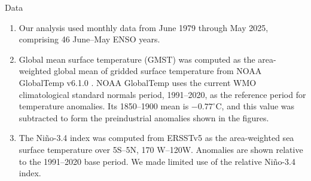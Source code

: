 \documentclass[aspectratio=169,xcolor=dvipsnames]{beamer}
\begin{document}
\begin{frame}{Data}
  \begin{enumerate}
  \item Our analysis used monthly data from June 1979 through May
    2025, comprising 46 June--May ENSO years.

  \item Global mean surface temperature (GMST) was computed as the
    area-weighted global mean of gridded surface temperature from NOAA
    GlobalTemp v6.1.0 \citep{Huang2022improvements}. NOAA GlobalTemp
    uses the current WMO climatological standard normals period,
    1991--2020, as the reference period for temperature anomalies. Its
    1850--1900 mean is $-0.77^\circ$C, and this value was subtracted
    to form the preindustrial anomalies shown in the figures.

  \item The Ni\~no-3.4 index was computed from ERSSTv5
    \citep{Huang:ERSST5} as the area-weighted sea surface temperature
    over 5\textdegree S--5\textdegree N, 170\textdegree
    W--120\textdegree W.  Anomalies are shown relative to the
    1991--2020 base period. We made limited use of the relative
    Ni\~no-3.4 index.
  
  \end{enumerate}
\end{frame}
\end{document}
